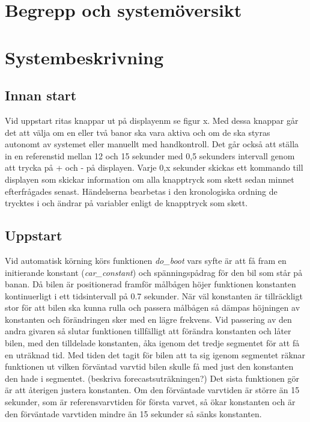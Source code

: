 \documentclass[10pt,oneside,swedish]{lips-no_customer}
\begin{document}
\section{Begrepp och systemöversikt}
\section{Systembeskrivning}

\subsection{Innan start}

Vid uppstart ritas knappar ut på displayenm se figur x. Med dessa knappar går
det att välja om en eller två banor ska vara aktiva och om de ska styras
autonomt av systemet eller manuellt med handkontroll. Det går också att ställa
in en referenstid mellan 12 och 15 sekunder med 0,5 sekunders intervall genom
att trycka på + och - på displayen. Varje 0,x sekunder skickas ett kommando till
displayen som skickar information om alla knapptryck som skett sedan minnet
efterfrågades senast. Händelserna bearbetas i den kronologiska ordning de
trycktes i och ändrar på variabler enligt de knapptryck som skett.

\subsection{Uppstart} 

Vid automatisk körning körs funktionen \emph{do\_boot} vars syfte är att få fram en
initierande konstant (\emph{car\_constant}) och spänningspådrag för den bil som står på banan. Då bilen är
positionerad framför målbågen höjer funktionen konstanten kontinuerligt i ett
tidsintervall på 0.7 sekunder. När väl konstanten är tillräckligt stor för att
bilen ska kunna rulla och passera målbågen så dämpas höjningen av konstanten och förändringen sker med en lägre frekvens. Vid passering av den andra givaren så slutar
funktionen tillfälligt att förändra konstanten och låter bilen, med den
tilldelade konstanten, åka igenom det tredje segmentet för att få en uträknad tid. Med
tiden det tagit för bilen att ta sig igenom segmentet räknar funktionen ut
vilken förväntad varvtid bilen skulle få med just den konstanten den hade i
segmentet. (beskriva forecastsuträkningen?) Det sista funktionen gör är att
återigen justera konstanten. Om den förväntade varvtiden är större än 15
sekunder, som är referensvarvtiden för första varvet, så ökar konstanten och är
den förväntade varvtiden mindre än 15 sekunder så sänks konstanten. 
\end{document}
